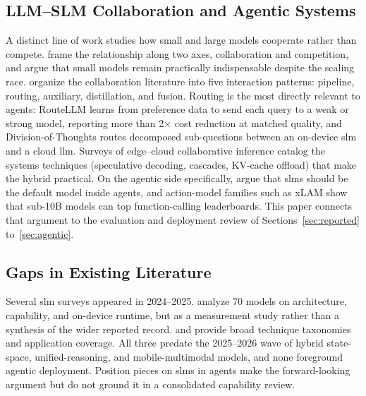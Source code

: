 \subsection{LLM--SLM Collaboration and Agentic Systems}
\label{subsec:background_collab}
A distinct line of work studies how small and large models cooperate rather than compete. \citet{chen2024role_small} frame the relationship along two axes, collaboration and competition, and argue that small models remain practically indispensable despite the scaling race. \citet{chen2025collab_survey} organize the collaboration literature into five interaction patterns: pipeline, routing, auxiliary, distillation, and fusion. Routing is the most directly relevant to agents: RouteLLM \citep{ong2024routellm} learns from preference data to send each query to a weak or strong model, reporting more than 2$\times$ cost reduction at matched quality, and Division-of-Thoughts \citep{division_of_thoughts_2025} routes decomposed sub-questions between an on-device \gls{slm} and a cloud \gls{llm}. Surveys of edge--cloud collaborative inference \citep{xu2024device} catalog the systems techniques (speculative decoding, cascades, KV-cache offload) that make the hybrid practical. On the agentic side specifically, \citet{belcak2025slm_agentic} argue that \glspl{slm} should be the default model inside agents, and action-model families such as xLAM \citep{zhang2024xlam} show that sub-10B models can top function-calling leaderboards. This paper connects that argument to the evaluation and deployment review of Sections~\ref{sec:reported} to~\ref{sec:agentic}.

\subsection{Gaps in Existing Literature}
\label{subsec:background_gaps}
Several \gls{slm} surveys appeared in 2024--2025. \citet{lu2024slmsurvey} analyze 70 models on architecture, capability, and on-device runtime, but as a measurement study rather than a synthesis of the wider reported record. \citet{vannguyen2024slm_survey} and \citet{wang2024comprehensive} provide broad technique taxonomies and application coverage. All three predate the 2025--2026 wave of hybrid state-space, unified-reasoning, and mobile-multimodal models, and none foreground agentic deployment. Position pieces on \glspl{slm} in agents \citep{belcak2025slm_agentic} make the forward-looking argument but do not ground it in a consolidated capability review.

